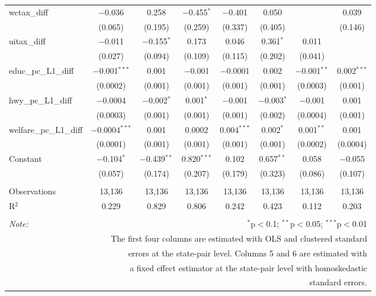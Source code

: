 \begin{table}[!htbp]
\begin{tabular}{@{\extracolsep{5pt}}lccccccc}
  wctax\_diff & $-$0.036 & 0.258 & $-$0.455$^{*}$ & $-$0.401 & 0.050 &  & 0.039 \\ 
  & (0.065) & (0.195) & (0.259) & (0.337) & (0.405) &  & (0.146) \\ 
  uitax\_diff & $-$0.011 & $-$0.155$^{*}$ & 0.173 & 0.046 & 0.361$^{*}$ & 0.011 &  \\ 
  & (0.027) & (0.094) & (0.109) & (0.115) & (0.202) & (0.041) &  \\ 
  educ\_pc\_L1\_diff & $-$0.001$^{***}$ & 0.001 & $-$0.001 & $-$0.0001 & 0.002 & $-$0.001$^{**}$ & 0.002$^{***}$ \\ 
  & (0.0002) & (0.001) & (0.001) & (0.001) & (0.001) & (0.0003) & (0.001) \\ 
  hwy\_pc\_L1\_diff & $-$0.0004 & $-$0.002$^{*}$ & 0.001$^{*}$ & $-$0.001 & $-$0.003$^{*}$ & $-$0.001 & 0.001 \\ 
  & (0.0003) & (0.001) & (0.001) & (0.001) & (0.002) & (0.0004) & (0.001) \\ 
  welfare\_pc\_L1\_diff & $-$0.0004$^{***}$ & 0.001 & 0.0002 & 0.004$^{***}$ & 0.002$^{*}$ & 0.001$^{**}$ & 0.001 \\ 
  & (0.0001) & (0.001) & (0.001) & (0.001) & (0.001) & (0.0002) & (0.0004) \\ 
  Constant & $-$0.104$^{*}$ & $-$0.439$^{**}$ & 0.820$^{***}$ & 0.102 & 0.657$^{**}$ & 0.058 & $-$0.055 \\ 
  & (0.057) & (0.174) & (0.207) & (0.179) & (0.323) & (0.086) & (0.107) \\ 
 \hline \\[-1.8ex] 
Observations & 13,136 & 13,136 & 13,136 & 13,136 & 13,136 & 13,136 & 13,136 \\ 
R$^{2}$ & 0.229 & 0.829 & 0.806 & 0.242 & 0.423 & 0.112 & 0.203 \\ 
\hline 
\hline \\[-1.8ex] 
\textit{Note:}  & \multicolumn{7}{r}{$^{*}$p$<$0.1; $^{**}$p$<$0.05; $^{***}$p$<$0.01} \\ 
 & \multicolumn{7}{r}{The first four columns are estimated with OLS and clustered standard} \\ 
 & \multicolumn{7}{r}{ errors at the state-pair level. Columns 5 and 6 are estimated with} \\ 
 & \multicolumn{7}{r}{a fixed effect estimator at the state-pair level with homoskedastic} \\ 
 & \multicolumn{7}{r}{standard errors.} \\ 
\end{tabular} 
\end{table} 
